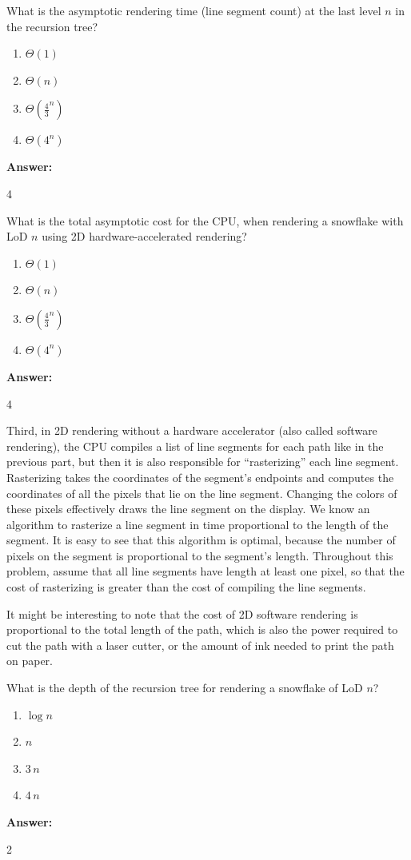 \documentclass[12pt,twoside]{article}
\newcommand{\answer}{
 \par\medskip
 \textbf{Answer:}
}
\newcommand{\answerIk}{ \answer
4
}
\newcommand{\answerIl}{ \answer
4
}
\newcommand{\answerIm}{ \answer
2
}
\begin{document}
\begin{problems}
\begin{problemparts}
  \problempart {} What is the asymptotic rendering time (line segment count) at
  the last level $n$ in the recursion tree?
    \begin{enumerate}
      \item $\Theta(1)$
      \item $\Theta(n)$
      \item $\Theta(\frac{4}{3}^n)$
      \item $\Theta(4^n)$
    \end{enumerate}
\answerIk

  \problempart {} What is the total asymptotic cost for the CPU, when rendering
  a snowflake with LoD $n$ using 2D hardware-accelerated rendering?
    \begin{enumerate}
      \item $\Theta(1)$
      \item $\Theta(n)$
      \item $\Theta(\frac{4}{3}^n)$
      \item $\Theta(4^n)$
    \end{enumerate}
\answerIl

\end{problemparts}

Third, in 2D rendering without a hardware accelerator (also called
software rendering), the CPU compiles a list of line segments for each path like
in the previous part, but then it is also responsible for ``rasterizing'' each
line segment. Rasterizing takes the coordinates of the segment's endpoints and
computes the coordinates of all the pixels that lie on the line segment.
Changing the colors of these pixels effectively draws the line segment on the
display. We know an algorithm to rasterize a line segment in time proportional
to the length of the segment. It is easy to see that this algorithm is optimal,
because the number of pixels on the segment is proportional to the segment's
length. Throughout this problem, assume that all line segments have length
at least one pixel, so that the cost of rasterizing is greater than the cost
of compiling the line segments.

It might be interesting to note that the cost of 2D software rendering is
proportional to the total length of the path, which is also the power required
to cut the path with a laser cutter, or the amount of ink needed to print the
path on paper.

\begin{problemparts}
  \problempart {} What is the depth of the recursion tree for rendering a
  snowflake of LoD $n$?
    \begin{enumerate}
      \item $\log n$
      \item $n$
      \item $3 \, n$
      \item $4 \, n$
    \end{enumerate}
\answerIm


\end{problemparts}
\end{problems}
\end{document}
